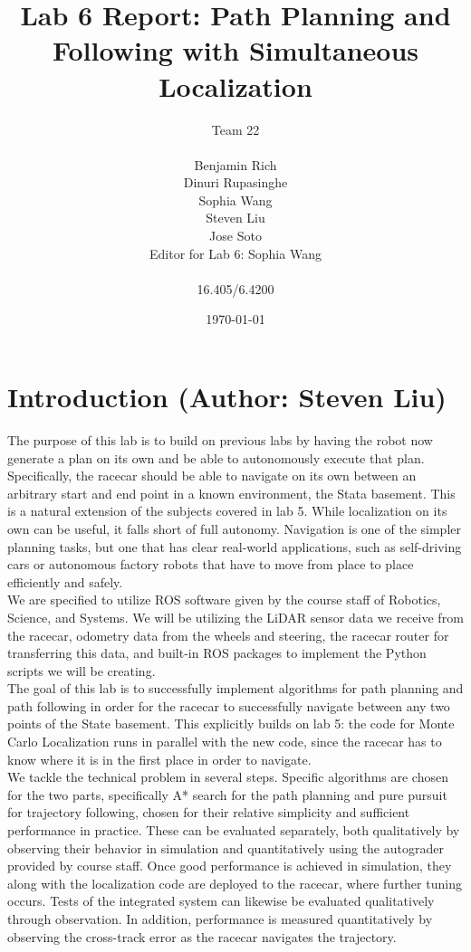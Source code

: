 \documentclass{article}
\title{Lab 6 Report: Path Planning and Following with Simultaneous Localization} %
\author{Team 22 \\\\ Benjamin Rich \\ Dinuri Rupasinghe \\ Sophia Wang \\ Steven Liu \\ Jose Soto  \\ Editor for Lab 6: Sophia Wang\\\\ 16.405/6.4200} %
\date{\today} %
\begin{document}
\maketitle


\tableofcontents
\newpage


\section{Introduction (Author: Steven Liu)}

The purpose of this lab is to build on previous labs by having the robot now generate a plan on its own and be able to autonomously execute that plan. Specifically, the racecar should be able to navigate on its own between an arbitrary start and end point in a known environment, the Stata basement. This is a natural extension of the subjects covered in lab 5. While localization on its own can be useful, it falls short of full autonomy. Navigation is one of the simpler planning tasks, but one that has clear real-world applications, such as self-driving cars or autonomous factory robots that have to move from place to place efficiently and safely. \\

We are specified to utilize ROS software given by the course staff of Robotics, Science, and Systems. We will be utilizing the LiDAR sensor data we receive from the racecar, odometry data from the wheels and steering, the racecar router for transferring this data, and built-in ROS packages to implement the Python scripts we will be creating. \\

The goal of this lab is to successfully implement algorithms for path planning and path following in order for the racecar to successfully navigate between any two points of the State basement. This explicitly builds on lab 5: the code for Monte Carlo Localization runs in parallel with the new code, since the racecar has to know where it is in the first place in order to navigate. \\

We tackle the technical problem in several steps. Specific algorithms are chosen for the two parts, specifically A* search for the path planning and pure pursuit for trajectory following, chosen for their relative simplicity and sufficient performance in practice. These can be evaluated separately, both qualitatively by observing their behavior in simulation and quantitatively using the autograder provided by course staff. Once good performance is achieved in simulation, they along with the localization code are deployed to the racecar, where further tuning occurs. Tests of the integrated system can likewise be evaluated qualitatively through observation. In addition, performance is measured quantitatively by observing the cross-track error as the racecar navigates the trajectory.
\end{document}
